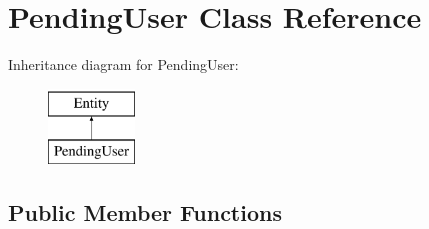\hypertarget{classPendingUser}{
\section{PendingUser Class Reference}
\label{classPendingUser}
}
Inheritance diagram for PendingUser:\begin{figure}[H]
\begin{center}
\leavevmode
\includegraphics[height=2.000000cm]{classPendingUser}
\end{center}
\end{figure}
\subsection*{Public Member Functions}
